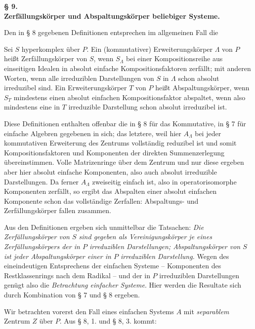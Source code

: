 \begin{center}
\textbf{§ 9.}\\[0.8ex]
\textbf{Zerfällungskörper und Abspaltungskörper beliebiger Systeme.}
\end{center}

\noindent\textbf{}
Den in § 8 gegebenen Definitionen entsprechen im allgemeinen Fall die

\noindent\textbf{} Sei \(S\) hyperkomplex über \(P\). Ein (kommutativer) Erweiterungskörper \(\Lambda\) von \(P\) heißt Zerfällungskörper von \(S\), wenn \(S_\Lambda\) bei einer Kompositionsreihe aus einseitigen Idealen in absolut einfache Kompositionsfaktoren zerfällt; mit anderen Worten, wenn alle irreduziblen Darstellungen von \(S\) in \(\Lambda\) schon absolut irreduzibel sind. Ein Erweiterungskörper \(T\) von \(P\) heißt Abspaltungskörper, wenn \(S_T\) mindestens einen absolut einfachen Kompositionsfaktor abspaltet, wenn also mindestens eine in \(T\) irreduzible Darstellung schon absolut irreduzibel ist.

Diese Definitionen enthalten offenbar die in § 8 für das Kommutative, in § 7 für einfache Algebren gegebenen in sich; das letztere, weil hier \(A_\Lambda\) bei jeder kommutativen Erweiterung des Zentrums vollständig reduzibel ist und somit Kompositionsfaktoren und Komponenten der direkten Summenzerlegung übereinstimmen. Volle Matrizenringe über dem Zentrum und nur diese ergeben aber hier absolut einfache Komponenten, also auch absolut irreduzible Darstellungen. Da ferner \(A_\Lambda\) zweiseitig einfach ist, also in operatorisomorphe Komponenten zerfällt, so ergibt das Abspalten einer absolut einfachen Komponente schon das vollständige Zerfallen: Abspaltungs- und Zerfällungskörper fallen zusammen.

Aus den Definitionen ergeben sich unmittelbar die Tatsachen: \emph{Die Zerfällungskörper von \(S\) sind gegeben als Vereinigungskörper je eines Zerfällungskörpers der in \(P\) irreduziblen Darstellungen; Abspaltungskörper von \(S\) ist jeder Abspaltungskörper einer in \(P\) irreduziblen Darstellung.} Wegen des eineindeutigen Entsprechens der einfachen Systeme -- Komponenten des Restklassenrings nach dem Radikal -- und der in \(P\) irreduziblen Darstellungen genügt also die \emph{Betrachtung einfacher Systeme}. Hier werden die Resultate sich durch Kombination von § 7 und § 8 ergeben.


\noindent\textbf{} Wir betrachten vorerst den Fall eines einfachen Systems \(A\) mit \emph{separablem} Zentrum \(Z\) über \(P\). Aus § 8, 1. und § 8, 3. kommt:

